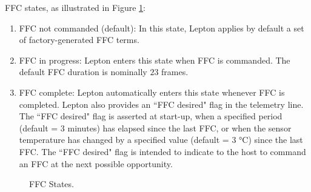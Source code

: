 FFC states, as illustrated in Figure \ref{fig:FFC States}: \begin{enumerate}
\item FFC not commanded (default): In this state, Lepton applies by default a
set of factory-generated FFC terms. \item FFC in progress: Lepton enters this
state when FFC is commanded. The default FFC duration is nominally $23$ frames.
\item FFC complete: Lepton automatically enters this state whenever FFC is
completed. Lepton also provides an ``FFC desired" flag in the telemetry line.
The ``FFC desired" flag is asserted at start-up, when a specified period
(default = 3 minutes) has elapsed since the last FFC, or when the sensor
temperature has changed by a specified value (default = 3 \si{\celsius}) since
the last FFC. The ``FFC desired" flag is intended to indicate to the host to
command an FFC at the next possible opportunity.
\end{enumerate}
%
\begin{figure}[htb]
    \centering
    \resizebox{0.35\textwidth}{!}{}
    \caption{FFC States.}
    \label{fig:FFC States}
\end{figure}
%
